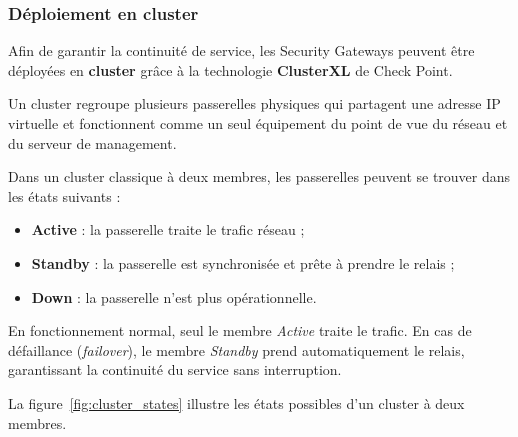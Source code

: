 \subsubsection{Déploiement en cluster}

Afin de garantir la continuité de service, les Security Gateways
peuvent être déployées en \textbf{cluster} grâce à la technologie
\textbf{ClusterXL} de Check Point.

Un cluster regroupe plusieurs passerelles physiques qui partagent
une adresse IP virtuelle et fonctionnent comme un seul
équipement du point de vue du réseau et du serveur de management.

Dans un cluster classique à deux membres, les passerelles peuvent
se trouver dans les états suivants :

\begin{itemize}
    \item \textbf{Active} : la passerelle traite le trafic réseau ;
    \item \textbf{Standby} : la passerelle est synchronisée et prête
    à prendre le relais ;
    \item \textbf{Down} : la passerelle n’est plus opérationnelle.
\end{itemize}

En fonctionnement normal, seul le membre \textit{Active} traite le
trafic. En cas de défaillance  (\textit{failover}), le membre \textit{Standby} prend
automatiquement le relais, garantissant la
continuité du service sans interruption.

La figure~\ref{fig:cluster_states} illustre les états possibles d'un
cluster à deux membres.
 
